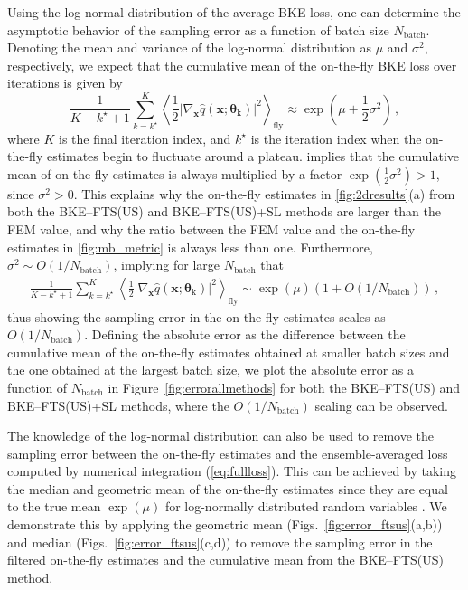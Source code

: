 \documentclass{article}
\numberwithin{equation}{section}
\def\*#1{\mathbf{#1}}
\theoremstyle{definition}
\theoremstyle{remark}
\def\thetab{\boldsymbol{\theta}}
\begin{document}
Using the log-normal distribution of the average BKE loss, one can determine the asymptotic behavior of the sampling error as a function of batch size $N_\mathrm{batch}$.
Denoting the mean and variance of the log-normal distribution as $ \mu $ and $ \sigma^{2} $, respectively, we expect that the cumulative mean of the on-the-fly BKE loss over iterations is given by \cite{forbes2011statistical}
\begin{equation}
    \frac{1}{K-k^\star+1} \sum_{k=k^\star}^{K} \left\langle \frac{1}{2} |\nabla_{\* x} \hat{q}(\* x; \thetab_{\mathrm{k}}) |^2 \right\rangle_{\mathrm{fly}} \approx \exp \left( \mu + \frac{1}{2} \sigma^{2} \right)  \label{eq:meanfromlognormal} \,,
\end{equation}
where $K$ is the final iteration index, and $k^\star$ is the iteration index when the on-the-fly estimates begin to fluctuate around a plateau.
 implies that the cumulative mean of on-the-fly estimates is always multiplied by a factor $ \exp \left(\frac{1}{2} \sigma^{2} \right) > 1$, since $\sigma^2 > 0$. This explains why the on-the-fly estimates in \cref{fig:2dresults}(a) from both the BKE--FTS(US) and BKE--FTS(US)+SL methods are larger than the FEM value, and why the ratio between the FEM value and the on-the-fly estimates in \cref{fig:mb_metric} is always less than one. Furthermore, $ \sigma^{2} \sim O(1/N_\mathrm{batch}) $, implying  for large $N_\mathrm{batch}$ that 
\begin{align}
\frac{1}{K-k^\star+1} \sum_{k=k^\star}^{K} \left\langle \frac{1}{2} |\nabla_{\* x} \hat{q}(\* x; \thetab_{\mathrm{k}})|^2 \right\rangle_{\mathrm{fly}} \sim \exp \left( \mu\right)(1+O(1/N_\mathrm{batch})) \,,  
\end{align}
thus showing the sampling error in the on-the-fly estimates scales as $O(1/N_\mathrm{batch})$. Defining the absolute error as the difference between the cumulative mean of the on-the-fly estimates obtained at smaller batch sizes and the one obtained at the largest batch size, we plot the absolute error as a function of $N_\mathrm{batch}$ in Figure~\ref{fig:errorallmethods} for both the BKE--FTS(US) and BKE--FTS(US)+SL methods, where the $O(1/N_\mathrm{batch})$ scaling can be observed.

The knowledge of the log-normal distribution can also be used to remove the sampling error between the on-the-fly estimates and the ensemble-averaged loss computed by numerical integration (\cref{eq:fullloss}). This can be achieved by taking the median and geometric mean of the on-the-fly estimates since they are equal to the true mean $ \exp ( \mu ) $  for log-normally distributed random variables \cite{forbes2011statistical}. We demonstrate this by applying the geometric mean (Figs.~\ref{fig:error_ftsus}(a,b)) and median (Figs.~\ref{fig:error_ftsus}(c,d)) to remove the sampling error in the filtered on-the-fly estimates and the cumulative mean from the BKE--FTS(US) method. 
\end{document}
